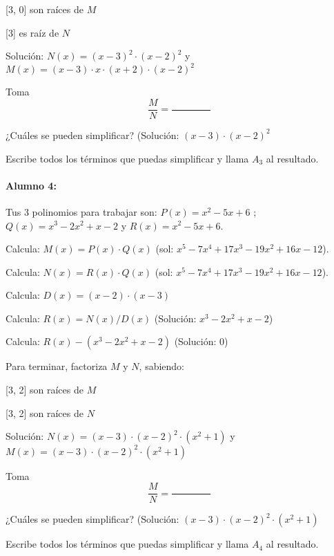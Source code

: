      [3, 0]  son raíces de $M$

     [3]  es raíz de $N$

Solución: $N(x) =  (x - 3)^2 \cdot  (x - 2)^2 $ y $M(x) =  (x - 3) \cdot  x \cdot  (x + 2) \cdot  (x - 2)^2 $

Toma \[\frac{M}{N} = \frac{\quad\quad\quad\quad}{\quad\quad\quad\quad}\]

¿Cuáles se pueden simplificar? (Solución: $ (x - 3) \cdot  (x - 2)^2 $

Escribe todos los términos que puedas simplificar y llama $A_3$ al resultado.













\paragraph{Alumno 4:\\}



Tus 3 polinomios para trabajar son: $P(x) =  x^2 - 5x + 6 $ ; $Q(x) =  x^3 - 2x^2 + x - 2 $ y $R(x) =  x^2 - 5x + 6 $.



Calcula: $M(x) = P(x)\cdot  Q(x)$ (sol: $ x^5 - 7x^4 + 17x^3 - 19x^2 + 16x - 12 $).

Calcula: $N(x) = R(x)\cdot  Q(x)$ (sol: $ x^5 - 7x^4 + 17x^3 - 19x^2 + 16x - 12 $).

Calcula: $D(x) = ( x - 2 )\cdot  ( x - 3 )$

Calcula: $R(x) = N(x) / D(x)$ (Solución: $ x^3 - 2x^2 + x - 2 $)

Calcula: $R(x) - ( x^3 - 2x^2 + x - 2 )$ (Solución: $ 0 $)

Para terminar, factoriza $M$ y $N$, sabiendo:

     [3, 2]  son raíces de $M$

     [3, 2]  son raíces de $N$

Solución: $N(x) =  (x - 3) \cdot  (x - 2)^2 \cdot  (x^2 + 1) $ y $M(x) =  (x - 3) \cdot  (x - 2)^2 \cdot  (x^2 + 1) $

Toma \[\frac{M}{N} = \frac{\quad\quad\quad\quad}{\quad\quad\quad\quad}\]

¿Cuáles se pueden simplificar? (Solución: $ (x - 3) \cdot  (x - 2)^2 \cdot  (x^2 + 1) $

Escribe todos los términos que puedas simplificar y llama $A_4$ al resultado.





